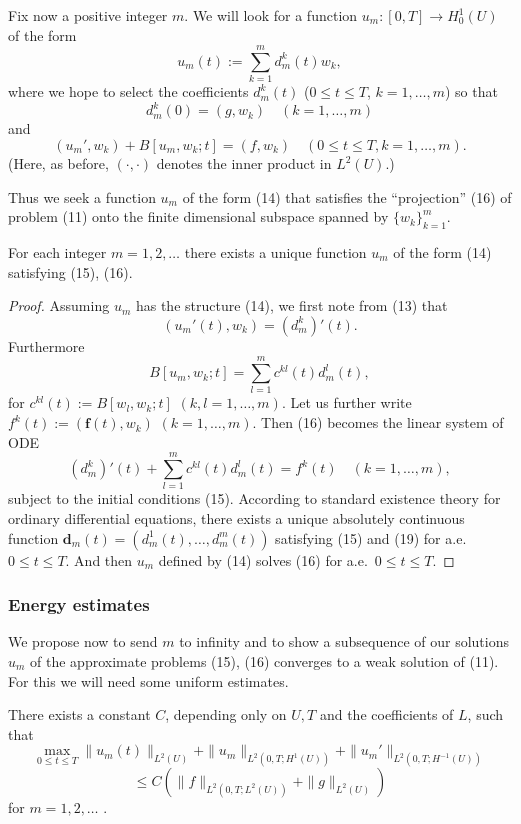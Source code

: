 Fix now a positive integer $m$. We will look for a function $u_m : [0,T] \to H_0^1(U)$ of the form
\[
u_m(t) := \sum_{k=1}^{m} d_m^k(t)w_k, \tag{14}
\]
where we hope to select the coefficients $d_m^k(t)$ ($0 \le t \le T$, $k = 1, \ldots, m$) so that
\[
d_m^k(0) = (g, w_k) \quad (k = 1, \ldots, m) \tag{15}
\]
and
\[
(u_m', w_k) + B[u_m, w_k; t] = (f, w_k) \quad (0 \le t \le T, k = 1, \ldots, m). \tag{16}
\]
(Here, as before, $(\cdot, \cdot)$ denotes the inner product in $L^2(U)$.)

Thus we seek a function $u_m$ of the form (14) that satisfies the ``projection'' (16) of problem (11) onto the finite dimensional subspace spanned by $\{w_k\}_{k=1}^{m}$.

\begin{theorem}
\label{thm:parabolic-galerkin-approximate-solutions}
For each integer $m = 1, 2, \ldots$ there exists a unique function $u_m$ of the form (14) satisfying (15), (16).
\end{theorem}

\begin{proof}
Assuming $u_m$ has the structure (14), we first note from (13) that
\[
(u_m'(t), w_k) = (d_m^k)'(t).
\]
Furthermore
\[
B[u_m, w_k; t] = \sum_{l=1}^{m} c^{kl}(t)d^l_m(t),
\]
for $c^{kl}(t) := B[w_l, w_k; t]$ $(k, l = 1, \ldots, m)$. Let us further write $f^k(t) := (\mathbf{f}(t), w_k)$ $(k = 1, \ldots, m)$. Then (16) becomes the linear system of ODE
\[
(d_m^k)'(t) + \sum_{l=1}^{m} c^{kl}(t)d^l_m(t) = f^k(t) \quad (k = 1, \ldots, m),
\tag{19}
\]
subject to the initial conditions (15). According to standard existence theory for ordinary differential equations, there exists a unique absolutely continuous function $\mathbf{d}_m(t) = (d^1_m(t), \ldots, d^m_m(t))$ satisfying (15) and (19) for a.e.\ $0 \leq t \leq T$. And then $u_m$ defined by (14) solves (16) for a.e.\ $0 \leq t \leq T$.
\end{proof}

\subsubsection{Energy estimates}

We propose now to send $m$ to infinity and to show a subsequence of our solutions $u_m$ of the approximate problems (15), (16) converges to a weak solution of (11). For this we will need some uniform estimates.

\begin{theorem}
\label{thm:parabolic-energy-estimates}
There exists a constant $C$, depending only on $U, T$ and the coefficients of $L$, such that
\[
\max_{0 \leq t \leq T} \|u_m(t)\|_{L^2(U)} + \|u_m\|_{L^2(0,T; H^1(U))} + \|u_m'\|_{L^2(0,T; H^{-1}(U))}
\]
\[
\leq C(\|f\|_{L^2(0,T; L^2(U))} + \|g\|_{L^2(U)})
\]
for $m = 1, 2, \ldots$ .
\end{theorem}

